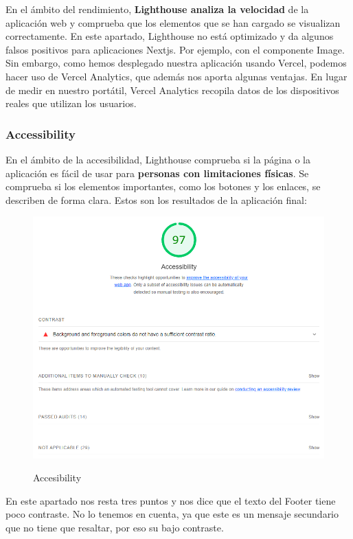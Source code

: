 \documentclass[12pt,twoside,titlepage]{report}
\begin{document}
En el ámbito del rendimiento, \textbf{Lighthouse analiza la velocidad} de la aplicación web y comprueba que los elementos que se han cargado se visualizan correctamente. En este apartado, Lighthouse no está optimizado y da algunos falsos positivos para aplicaciones Nextjs. Por ejemplo, con el componente Image. Sin embargo, como hemos desplegado nuestra aplicación usando Vercel, podemos hacer uso de Vercel Analytics, que además nos aporta algunas ventajas. En lugar de medir en nuestro portátil, Vercel Analytics recopila datos de los dispositivos reales que utilizan los usuarios. 

\subsubsection{Accessibility}

En el ámbito de la accesibilidad, Lighthouse comprueba si la página o la aplicación es fácil de usar para \textbf{personas con limitaciones físicas}. Se comprueba si los elementos importantes, como los botones y los enlaces, se describen de forma clara. Estos son los resultados de la aplicación final:

\begin{figure}[H]
    \centering
    \includegraphics[scale=0.6]{Lighthouse/Accesibility}
    \label{fig:Lighthouse_accesibility}
    \caption{Accesibility}
\end{figure}

En este apartado nos resta tres puntos y nos dice que el texto del Footer tiene poco contraste. No lo tenemos en cuenta, ya que este es un mensaje secundario que no tiene que resaltar, por eso su bajo contraste.
\end{document}
